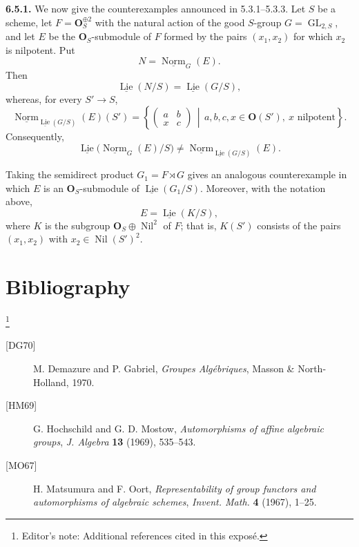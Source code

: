 \medskip
\noindent\textbf{6.5.1.}
We now give the counterexamples announced in 5.3.1--5.3.3. Let \(S\)
be a scheme, let \(F=\mathbf O_S^{\oplus2}\) with the natural action
of the good \(S\)-group \(G=\operatorname{GL}_{2,S}\), and let \(E\)
be the \(\mathbf O_S\)-submodule of \(F\) formed by the pairs
\((x_1,x_2)\) for which \(x_2\) is nilpotent. Put
\[
 N=\underline{\operatorname{Norm}}_G(E).
\]
Then
\[
 \underline{\operatorname{Lie}}(N/S)
   =\underline{\operatorname{Lie}}(G/S),
\]
whereas, for every \(S'\to S\),
\[
 \underline{\operatorname{Norm}}_
   {\underline{\operatorname{Lie}}(G/S)}(E)(S')
 =
 \left\{
 \begin{pmatrix}a&b\\x&c\end{pmatrix}
 \,\middle|\,
 a,b,c,x\in\mathbf O(S'),\ x\text{ nilpotent}
 \right\}.
\]
Consequently,
\[
 \underline{\operatorname{Lie}}
   \bigl(\underline{\operatorname{Norm}}_G(E)/S\bigr)
 \neq
 \underline{\operatorname{Norm}}_
   {\underline{\operatorname{Lie}}(G/S)}(E).
\]

Taking the semidirect product \(G_1=F\rtimes G\) gives an analogous
counterexample in which \(E\) is an \(\mathbf O_S\)-submodule of
\(\underline{\operatorname{Lie}}(G_1/S)\). Moreover, with the notation
above,
\[
 E=\underline{\operatorname{Lie}}(K/S),
\]
where \(K\) is the subgroup \(\mathbf O_S\oplus\operatorname{Nil}^2\)
of \(F\); that is, \(K(S')\) consists of the pairs \((x_1,x_2)\) with
\(x_2\in\operatorname{Nil}(S')^2\).

\section*{Bibliography}
\footnote{Editor's note: Additional references cited in this expos\'e.}

\begin{description}
\item[{[DG70]}] M. Demazure and P. Gabriel,
  \emph{Groupes Alg\'ebriques}, Masson \& North-Holland, 1970.
\item[{[HM69]}] G. Hochschild and G. D. Mostow,
  \emph{Automorphisms of affine algebraic groups},
  \emph{J. Algebra} \textbf{13} (1969), 535--543.
\item[{[MO67]}] H. Matsumura and F. Oort,
  \emph{Representability of group functors and automorphisms of
  algebraic schemes}, \emph{Invent. Math.} \textbf{4} (1967), 1--25.
\end{description}

